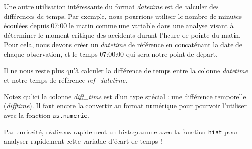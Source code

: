 \documentclass[
  11pt,
  french,
]{book}
\makeatletter
\newenvironment{Shaded}{\begin{snugshade}}{\end{snugshade}}
\newcommand{\DataTypeTok}[1]{\textcolor[rgb]{0.13,0.29,0.53}{#1}}
\newcommand{\DecValTok}[1]{\textcolor[rgb]{0.00,0.00,0.81}{#1}}
\newcommand{\KeywordTok}[1]{\textcolor[rgb]{0.13,0.29,0.53}{\textbf{#1}}}
\newcommand{\NormalTok}[1]{#1}
\newcommand{\OperatorTok}[1]{\textcolor[rgb]{0.81,0.36,0.00}{\textbf{#1}}}
\newcommand{\StringTok}[1]{\textcolor[rgb]{0.31,0.60,0.02}{#1}}
\newenvironment{kframe}{%
\medskip{}
\setlength{\fboxsep}{.8em}
 \def\at@end@of@kframe{}%
 \ifinner\ifhmode%
  \def\at@end@of@kframe{\end{minipage}}%
  \begin{minipage}{\columnwidth}%
 \fi\fi%
 \def\FrameCommand##1{\hskip\@totalleftmargin \hskip-\fboxsep
 \colorbox{shadecolor}{##1}\hskip-\fboxsep
     \hskip-\linewidth \hskip-\@totalleftmargin \hskip\columnwidth}%
 \MakeFramed {\advance\hsize-\width
   \@totalleftmargin\z@ \linewidth\hsize
   \@setminipage}}%
 {\par\unskip\endMakeFramed%
 \at@end@of@kframe}
\renewenvironment{Shaded}{\begin{kframe}}{\end{kframe}}
\makeatother
\begin{document}
Une autre utilisation intéressante du format \emph{datetime} est de calculer des différences de temps. Par exemple, nous pourrions utiliser le nombre de minutes écoulées depuis 07:00 le matin comme une variable dans une analyse visant à déterminer le moment critique des accidents durant l'heure de pointe du matin.
Pour cela, nous devons créer un \emph{datetime} de référence en concaténant la date de chaque observation, et le temps 07:00:00 qui sera notre point de départ.

\begin{Shaded}
\end{Shaded}

Il ne nous reste plus qu'à calculer la différence de temps entre la colonne \emph{datetime} et notre temps de référence \emph{ref\_datetime}.

\begin{Shaded}
\end{Shaded}

Notez qu'ici la colonne \emph{diff\_time} est d'un type spécial : une différence temporelle (\emph{difftime}). Il faut encore la convertir au format numérique pour pourvoir l'utiliser avec la fonction \texttt{as.numeric}.

Par curiosité, réalisons rapidement un histogramme avec la fonction \texttt{hist} pour analyser rapidement cette variable d'écart de temps !
\end{document}
